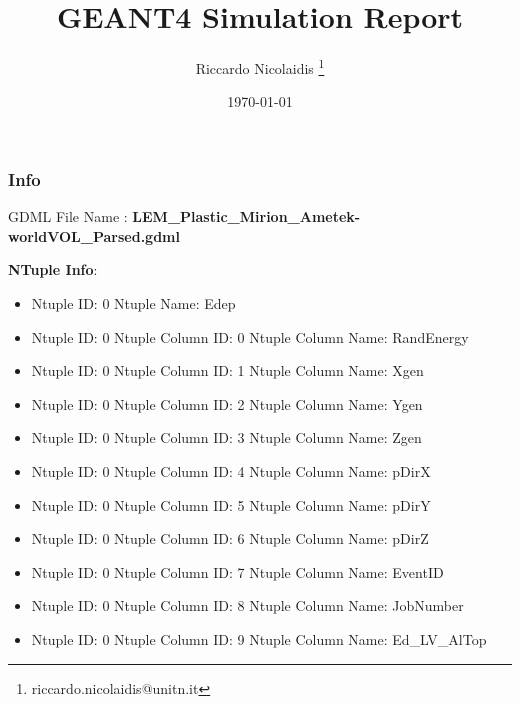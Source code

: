 \documentclass[8pt]{beamer}
\title{GEANT4 Simulation Report}
\author{Riccardo Nicolaidis \footnote{riccardo.nicolaidis@unitn.it}}
\date{\today}
\begin{document}
        
            \begin{frame}
                \titlepage
            \end{frame}
            
            \begin{frame}
                \frametitle{Info}
            
                \centering
                GDML File Name : \textbf{ LEM\_Plastic\_Mirion\_Ametek-worldVOL\_Parsed.gdml}
                
                
                \vspace{2 cm}
                \textbf{NTuple Info}:
                \vspace{1 cm}
                
        \begin{itemize}
        
        \item Ntuple ID: 0 Ntuple Name: Edep
        
        \item Ntuple ID: 0 Ntuple Column ID: 0 Ntuple Column Name: RandEnergy
        
        \item Ntuple ID: 0 Ntuple Column ID: 1 Ntuple Column Name: Xgen
        
        \item Ntuple ID: 0 Ntuple Column ID: 2 Ntuple Column Name: Ygen
        
        \item Ntuple ID: 0 Ntuple Column ID: 3 Ntuple Column Name: Zgen
        
        \item Ntuple ID: 0 Ntuple Column ID: 4 Ntuple Column Name: pDirX
        
        \item Ntuple ID: 0 Ntuple Column ID: 5 Ntuple Column Name: pDirY
        
        \item Ntuple ID: 0 Ntuple Column ID: 6 Ntuple Column Name: pDirZ
        
        \item Ntuple ID: 0 Ntuple Column ID: 7 Ntuple Column Name: EventID
        
        \item Ntuple ID: 0 Ntuple Column ID: 8 Ntuple Column Name: JobNumber
        
        \item Ntuple ID: 0 Ntuple Column ID: 9 Ntuple Column Name: Ed\_LV\_AlTop
        

\end{itemize}
\end{frame}
\end{document}
